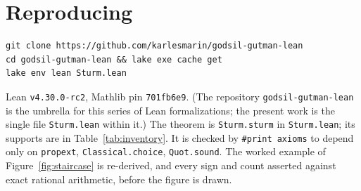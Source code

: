 \documentclass[11pt]{article}
\newcommand{\lean}[1]{\texttt{#1}}
\begin{document}
\section*{Reproducing}
\begin{verbatim}
git clone https://github.com/karlesmarin/godsil-gutman-lean
cd godsil-gutman-lean && lake exe cache get
lake env lean Sturm.lean
\end{verbatim}
Lean \lean{v4.30.0-rc2}, Mathlib pin \lean{701fb6e9}. (The repository
\texttt{godsil-gutman-lean} is the umbrella for this series of Lean formalizations; the present work
is the single file \lean{Sturm.lean} within it.) The theorem is \lean{Sturm.sturm} in
\lean{Sturm.lean}; its supports are in Table~\ref{tab:inventory}. It is checked by \lean{\#print
axioms} to depend only on \lean{propext}, \lean{Classical.choice}, \lean{Quot.sound}. The
worked example of Figure~\ref{fig:staircase} is re-derived, and every sign and count asserted
against exact rational arithmetic, before the figure is drawn.
\end{document}
